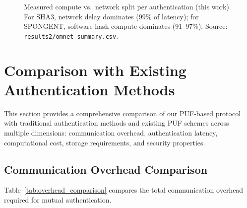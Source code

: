 \documentclass[11pt,a4paper]{article}
\begin{document}
\begin{figure}[H]
\centering
{}
\caption{Measured compute vs.\ network split per authentication (this work). For SHA3, network delay dominates (99\% of latency); for SPONGENT, software hash compute dominates (91--97\%). Source: \texttt{results2/omnet\_summary.csv}.}
\label{fig:compute_net_bar}
\end{figure}


\section{Comparison with Existing Authentication Methods}
\label{sec:comparison}

This section provides a comprehensive comparison of our PUF-based protocol with traditional authentication methods and existing PUF schemes across multiple dimensions: communication overhead, authentication latency, computational cost, storage requirements, and security properties.

\subsection{Communication Overhead Comparison}

Table~\ref{tab:overhead_comparison} compares the total communication overhead required for mutual authentication.
\end{document}
